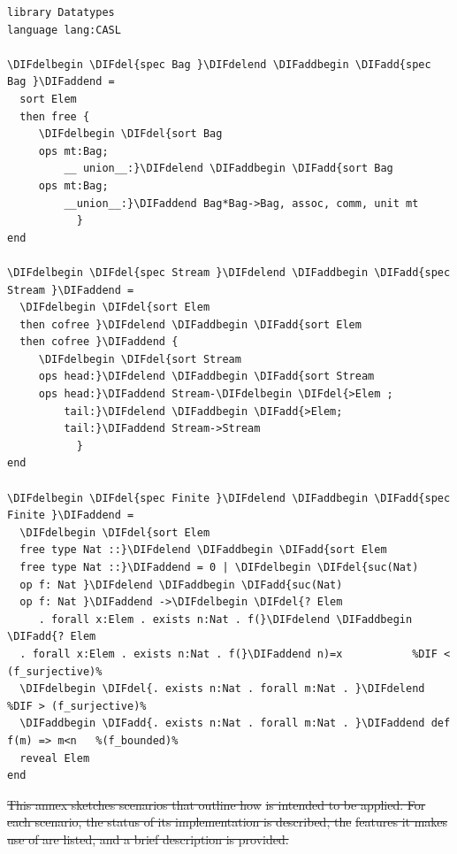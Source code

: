 \documentclass[10pt,fleqn,final]{scrreprt}
\newcommand*{\DOL}{\ensuremath{\mathsf{DOL}}\xspace}
\newcommand{\informative}[0]{{\begin{center}{\Large{(Informative})}\end{center}} \bigskip}
\newcommand{\infannex}[1]{ \chapter{Annex: #1}  \informative }
\providecommand{\DIFadd}[1]{{\protect\color{blue}\uwave{#1}}} %
\providecommand{\DIFdel}[1]{{\protect\color{red}\sout{#1}}}                      %
\providecommand{\DIFaddbegin}{} %
\providecommand{\DIFaddend}{} %
\providecommand{\DIFdelbegin}{} %
\providecommand{\DIFdelend}{} %
\begin{document}
\DIFdelbegin %
\DIFdelend \DIFaddbegin \begin{lstlisting}[basicstyle=\ttfamily,language=dolText,alsolanguage=CASL,escapechar=@,mathescape]
\DIFaddend %prefix( lang:  <http://purl.net/DOL/languages/> )%
library Datatypes
language lang:CASL

\DIFdelbegin \DIFdel{spec Bag }\DIFdelend \DIFaddbegin \DIFadd{spec Bag }\DIFaddend =
  sort Elem
  then free {
     \DIFdelbegin \DIFdel{sort Bag
     ops mt:Bag;
         __ union__:}\DIFdelend \DIFaddbegin \DIFadd{sort Bag
     ops mt:Bag;
         __union__:}\DIFaddend Bag*Bag->Bag, assoc, comm, unit mt
           }
end

\DIFdelbegin \DIFdel{spec Stream }\DIFdelend \DIFaddbegin \DIFadd{spec Stream }\DIFaddend =
  \DIFdelbegin \DIFdel{sort Elem
  then cofree }\DIFdelend \DIFaddbegin \DIFadd{sort Elem
  then cofree }\DIFaddend {
     \DIFdelbegin \DIFdel{sort Stream
     ops head:}\DIFdelend \DIFaddbegin \DIFadd{sort Stream
     ops head:}\DIFaddend Stream-\DIFdelbegin \DIFdel{>Elem ;
         tail:}\DIFdelend \DIFaddbegin \DIFadd{>Elem;
         tail:}\DIFaddend Stream->Stream
           }
end

\DIFdelbegin \DIFdel{spec Finite }\DIFdelend \DIFaddbegin \DIFadd{spec Finite }\DIFaddend =
  \DIFdelbegin \DIFdel{sort Elem
  free type Nat ::}\DIFdelend \DIFaddbegin \DIFadd{sort Elem
  free type Nat ::}\DIFaddend = 0 | \DIFdelbegin \DIFdel{suc(Nat)
  op f: Nat }\DIFdelend \DIFaddbegin \DIFadd{suc(Nat)
  op f: Nat }\DIFaddend ->\DIFdelbegin \DIFdel{? Elem
     . forall x:Elem . exists n:Nat . f(}\DIFdelend \DIFaddbegin \DIFadd{? Elem
  . forall x:Elem . exists n:Nat . f(}\DIFaddend n)=x           %DIF < (f_surjective)%
  \DIFdelbegin \DIFdel{. exists n:Nat . forall m:Nat . }\DIFdelend %DIF > (f_surjective)%
  \DIFaddbegin \DIFadd{. exists n:Nat . forall m:Nat . }\DIFaddend def f(m) => m<n   %(f_bounded)%
  reveal Elem
end

\end{lstlisting}

\DIFdelbegin %

\DIFdel{This annex sketches scenarios that outline how }%
\DIFdel{is intended to be applied.  For each scenario, the status of its implementation is described, the }%
\DIFdel{features it makes use of are listed, and a brief description is provided. }%
\end{document}
